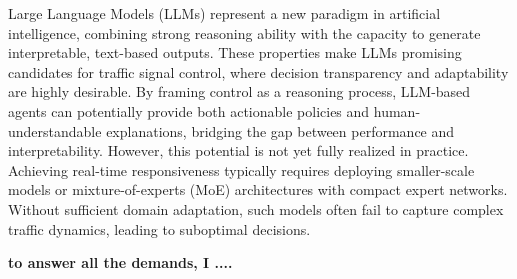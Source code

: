 Large Language Models (LLMs) represent a new paradigm in artificial intelligence, combining strong reasoning ability with the capacity to generate interpretable, text-based outputs. These properties make LLMs promising candidates for traffic signal control, where decision transparency and adaptability are highly desirable. By framing control as a reasoning process, LLM-based agents can potentially provide both actionable policies and human-understandable explanations, bridging the gap between performance and interpretability. However, this potential is not yet fully realized in practice. Achieving real-time responsiveness typically requires deploying smaller-scale models or mixture-of-experts (MoE) architectures with compact expert networks. Without sufficient domain adaptation, such models often fail to capture complex traffic dynamics, leading to suboptimal decisions.\par
\textbf{to answer all the demands, I ....}